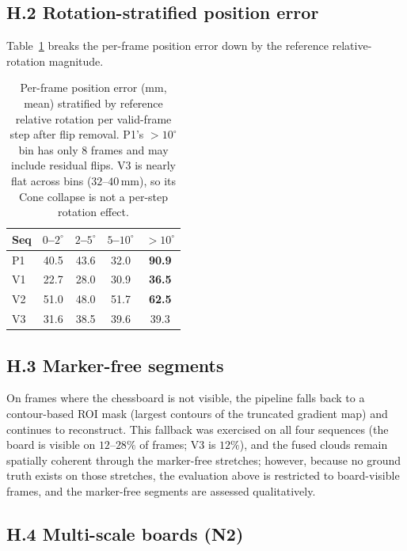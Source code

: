 \documentclass[review]{elsarticle}
\begin{document}
\subsection*{H.2 Rotation-stratified position error}

Table~\ref{tab:supp_rot_strat} breaks the per-frame position error down by the reference relative-rotation magnitude.

\begin{table}[h]
\centering
\caption{Per-frame position error (mm, mean) stratified by reference relative rotation per valid-frame step after flip removal. P1's ${>}10^{\circ}$ bin has only 8 frames and may include residual flips. V3 is nearly flat across bins ($32$--$40$\,mm), so its Cone collapse is not a per-step rotation effect.}
\label{tab:supp_rot_strat}
\setlength{\tabcolsep}{4pt}
\renewcommand{\arraystretch}{1.05}
\begin{tabular}{l cccc}
\toprule
Seq & $0$--$2^{\circ}$ & $2$--$5^{\circ}$ & $5$--$10^{\circ}$ & $>10^{\circ}$ \\
\midrule
P1 & 40.5 & 43.6 & 32.0 & \textbf{90.9} \\
V1 & 22.7 & 28.0 & 30.9 & \textbf{36.5} \\
V2 & 51.0 & 48.0 & 51.7 & \textbf{62.5} \\
V3 & 31.6 & 38.5 & 39.6 & 39.3 \\
\bottomrule
\end{tabular}
\end{table}

\subsection*{H.3 Marker-free segments}

On frames where the chessboard is not visible, the pipeline falls back to a contour-based ROI mask (largest contours of the truncated gradient map) and continues to reconstruct. This fallback was exercised on all four sequences (the board is visible on $12$--$28\%$ of frames; V3 is $12\%$), and the fused clouds remain spatially coherent through the marker-free stretches; however, because no ground truth exists on those stretches, the evaluation above is restricted to board-visible frames, and the marker-free segments are assessed qualitatively.

\subsection*{H.4 Multi-scale boards (N2)}
\end{document}
